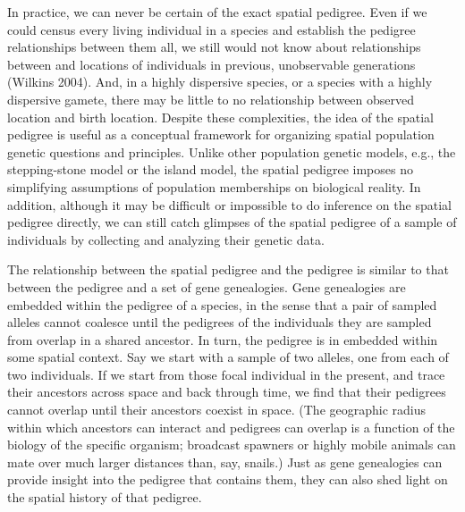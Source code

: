 \documentclass{ar-1col}
\newcommand{\plr}[1]{{\color{green}{#1}}}
\begin{document}
In practice, we can never be certain of the exact spatial pedigree.
Even if we could census every living individual in a species
and establish the pedigree relationships between them all,
we still would not know about relationships between
and locations of individuals in previous, unobservable generations (Wilkins 2004).
And, in a highly dispersive species,
or a species with a highly dispersive gamete,
there may be little to no relationship between observed location and birth location.
Despite these complexities,
the idea of the spatial pedigree is useful
as a conceptual framework for organizing
spatial population genetic questions and principles.
Unlike other population genetic models,
e.g., the stepping-stone model or the island model,
the spatial pedigree imposes no simplifying
assumptions of population memberships on biological reality.
In addition, although it may be difficult or impossible
to do inference on the spatial pedigree directly,
we can still catch glimpses of the spatial pedigree of a sample of individuals
by collecting and analyzing their genetic data.

The relationship between the spatial pedigree and the pedigree
is similar to that between the pedigree and a set of gene genealogies.
Gene genealogies are embedded within the pedigree of a species,
in the sense that a pair of sampled alleles cannot coalesce until
the pedigrees of the individuals they are sampled from overlap in a shared ancestor.
In turn, the pedigree is in embedded within some spatial context.
Say we start with a sample of two alleles, one from each of two individuals.
If we start from those focal individual in the present,
and trace their ancestors across space and back through time,
we find that their pedigrees cannot overlap until their ancestors coexist in space.
(The geographic radius within which ancestors can interact
and pedigrees can overlap is a function of the biology of the specific organism;
broadcast spawners or highly mobile animals can mate over much larger distances than, say, snails.)
Just as gene genealogies can provide insight into the pedigree that contains them,
they can also shed light on the spatial history of that pedigree.

\end{document}
